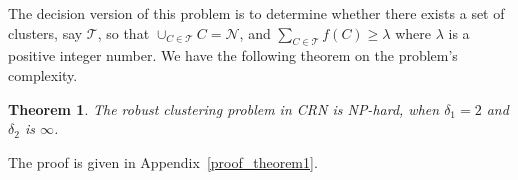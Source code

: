 \documentclass[times]{ettauth}
\theoremstyle{mytheoremstyle}
\newtheorem{theorem}{Theorem}[section]
\theoremstyle{mytheoremstyle}
\theoremstyle{mytheoremstyle}
\begin{document}
The decision version of this problem is to determine whether there exists a set of clusters, say $\mathcal{T}$, so that $\cup_{C\in\mathcal{T}} C = \mathcal{N}$, and $\sum_{C\in \mathcal{T}} f(C) \geqslant \lambda$ where $\lambda$ is a positive integer number.
We have the following theorem on the problem's complexity.
\begin{theorem}
\label{theorem1}
The robust clustering problem in CRN is NP-hard, when $\delta_1=2$ and $\delta_2 $ is $\infty$.
\end{theorem}
The proof is given in Appendix~\ref{proof_theorem1}.
\end{document}
